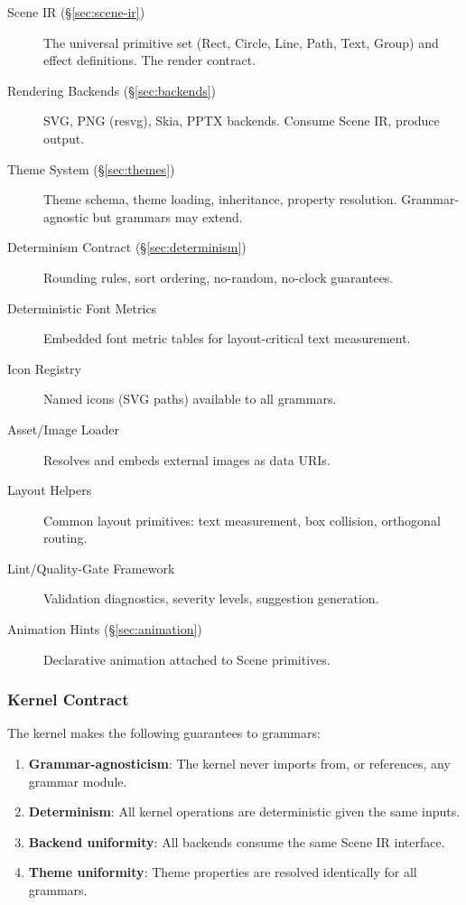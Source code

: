 \begin{description}
  \item[Scene IR (§\ref{sec:scene-ir})] The universal primitive set (Rect, Circle, Line, Path, Text, Group) and effect definitions. The render contract.
  
  \item[Rendering Backends (§\ref{sec:backends})] SVG, PNG (resvg), Skia, PPTX backends. Consume Scene IR, produce output.
  
  \item[Theme System (§\ref{sec:themes})] Theme schema, theme loading, inheritance, property resolution. Grammar-agnostic but grammars may extend.
  
  \item[Determinism Contract (§\ref{sec:determinism})] Rounding rules, sort ordering, no-random, no-clock guarantees.
  
  \item[Deterministic Font Metrics] Embedded font metric tables for layout-critical text measurement.
  
  \item[Icon Registry] Named icons (SVG paths) available to all grammars.
  
  \item[Asset/Image Loader] Resolves and embeds external images as data URIs.
  
  \item[Layout Helpers] Common layout primitives: text measurement, box collision, orthogonal routing.
  
  \item[Lint/Quality-Gate Framework] Validation diagnostics, severity levels, suggestion generation.
  
  \item[Animation Hints (§\ref{sec:animation})] Declarative animation attached to Scene primitives.
\end{description}

\subsubsection{Kernel Contract}

The kernel makes the following guarantees to grammars:

\begin{enumerate}
  \item \textbf{Grammar-agnosticism}: The kernel never imports from, or references, any grammar module.
  
  \item \textbf{Determinism}: All kernel operations are deterministic given the same inputs.
  
  \item \textbf{Backend uniformity}: All backends consume the same Scene IR interface.
  
  \item \textbf{Theme uniformity}: Theme properties are resolved identically for all grammars.
\end{enumerate}


